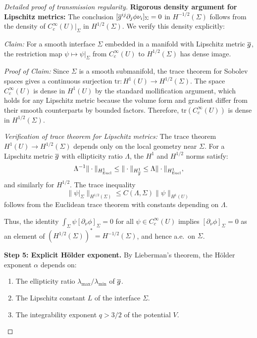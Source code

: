 \begin{proof}[Detailed proof of transmission regularity]
\textbf{Rigorous density argument for Lipschitz metrics:} The conclusion $[\overline{g}^{ij} \partial_j \phi \nu_i]_\Sigma = 0$ in $H^{-1/2}(\Sigma)$ follows from the density of $C^\infty_c(U)|_\Sigma$ in $H^{1/2}(\Sigma)$. We verify this density explicitly:

\textit{Claim:} For a smooth interface $\Sigma$ embedded in a manifold with Lipschitz metric $\overline{g}$, the restriction map $\psi \mapsto \psi|_\Sigma$ from $C^\infty_c(U)$ to $H^{1/2}(\Sigma)$ has dense image.

\textit{Proof of Claim:} Since $\Sigma$ is a smooth submanifold, the trace theorem for Sobolev spaces gives a continuous surjection $\mathrm{tr}: H^1(U) \to H^{1/2}(\Sigma)$. The space $C^\infty_c(U)$ is dense in $H^1(U)$ by the standard mollification argument, which holds for any Lipschitz metric because the volume form and gradient differ from their smooth counterparts by bounded factors. Therefore, $\mathrm{tr}(C^\infty_c(U))$ is dense in $H^{1/2}(\Sigma)$.

\textit{Verification of trace theorem for Lipschitz metrics:} The trace theorem $H^1(U) \to H^{1/2}(\Sigma)$ depends only on the local geometry near $\Sigma$. For a Lipschitz metric $\overline{g}$ with ellipticity ratio $\Lambda$, the $H^1$ and $H^{1/2}$ norms satisfy:
\begin{equation}
    \Lambda^{-1} \|\cdot\|_{H^1_{\mathrm{Eucl}}} \le \|\cdot\|_{H^1_{\overline{g}}} \le \Lambda \|\cdot\|_{H^1_{\mathrm{Eucl}}},
\end{equation}
and similarly for $H^{1/2}$. The trace inequality
\begin{equation}
    \|\psi|_\Sigma\|_{H^{1/2}(\Sigma)} \le C(\Lambda, \Sigma) \|\psi\|_{H^1(U)}
\end{equation}
follows from the Euclidean trace theorem with constants depending on $\Lambda$.

Thus, the identity $\int_\Sigma \psi [\partial_\nu \phi]_\Sigma = 0$ for all $\psi \in C^\infty_c(U)$ implies $[\partial_\nu \phi]_\Sigma = 0$ as an element of $(H^{1/2}(\Sigma))^* = H^{-1/2}(\Sigma)$, and hence a.e.\ on $\Sigma$.

\textbf{Step 5: Explicit H\"older exponent.}
By Lieberman's theorem, the H\"older exponent $\alpha$ depends on:
\begin{enumerate}
    \item The ellipticity ratio $\lambda_{\max}/\lambda_{\min}$ of $\overline{g}$.
    \item The Lipschitz constant $L$ of the interface $\Sigma$.
    \item The integrability exponent $q > 3/2$ of the potential $V$.
\end{enumerate}


\end{proof}
